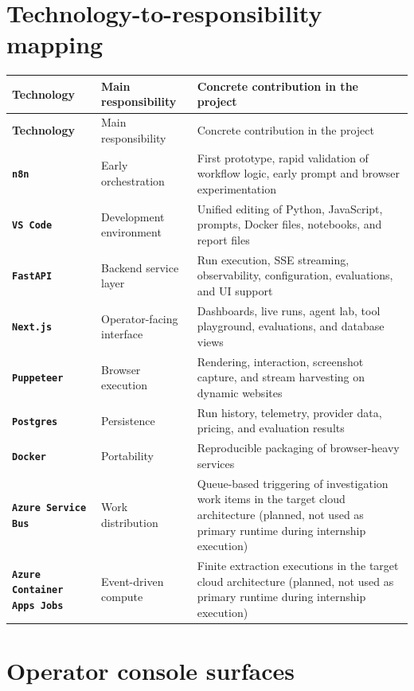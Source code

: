 \section{Technology-to-responsibility mapping}

\begin{longtable}{>{\bfseries}p{3cm}p{4cm}p{6.5cm}}
\toprule
\rowcolor{accent!8}
Technology & Main responsibility & Concrete contribution in the project \\
\midrule
\endfirsthead
\toprule
\rowcolor{accent!8}
Technology & Main responsibility & Concrete contribution in the project \\
\midrule
\endhead
\texttt{n8n} & Early orchestration & First prototype, rapid validation of workflow logic, early prompt and browser experimentation \\
\texttt{VS Code} & Development environment & Unified editing of Python, JavaScript, prompts, Docker files, notebooks, and report files \\
\texttt{FastAPI} & Backend service layer & Run execution, SSE streaming, observability, configuration, evaluations, and UI support \\
\texttt{Next.js} & Operator-facing interface & Dashboards, live runs, agent lab, tool playground, evaluations, and database views \\
\texttt{Puppeteer} & Browser execution & Rendering, interaction, screenshot capture, and stream harvesting on dynamic websites \\
\texttt{Postgres} & Persistence & Run history, telemetry, provider data, pricing, and evaluation results \\
\texttt{Docker} & Portability & Reproducible packaging of browser-heavy services \\
\texttt{Azure Service Bus} & Work distribution & Queue-based triggering of investigation work items in the target cloud architecture (planned, not used as primary runtime during internship execution) \\
\texttt{Azure Container Apps Jobs} & Event-driven compute & Finite extraction executions in the target cloud architecture (planned, not used as primary runtime during internship execution) \\
\bottomrule
\end{longtable}

\section{Operator console surfaces}

